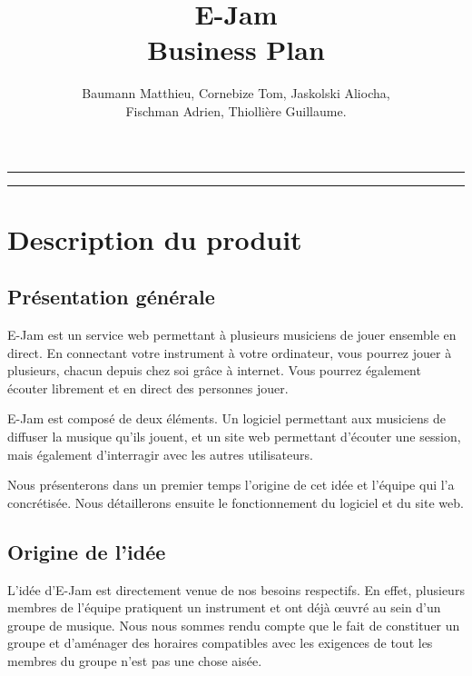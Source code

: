 \documentclass[a4,12pt]{article}
\begin{document}
\begin{titlepage}
\title{ E-Jam \\ Business Plan}
\author{Baumann Matthieu, Cornebize Tom, Jaskolski Aliocha, \\Fischman Adrien, Thiollière Guillaume.}
\end{titlepage}
\date{}

\maketitle

\rule[0.5ex]{\textwidth}{0.2mm}


\rule[0.5ex]{\textwidth}{0.2mm}

\newpage
\tableofcontents
\newpage

\section{Description du produit}


\subsection{Présentation générale}

E-Jam est un service web permettant à plusieurs musiciens de jouer ensemble en direct.
En connectant votre instrument à votre ordinateur, vous pourrez jouer à plusieurs,
chacun depuis chez soi grâce à internet.
Vous pourrez également écouter librement et en direct des personnes jouer.

E-Jam est composé de deux éléments. Un logiciel permettant aux musiciens de diffuser
la musique qu'ils jouent, et un site web permettant d'écouter une session, mais
également d'interragir avec les autres utilisateurs.

Nous présenterons dans un premier temps l'origine de cet idée et l'équipe qui
l'a concrétisée. Nous détaillerons ensuite le fonctionnement du logiciel et du
site web.



\subsection{Origine de l'idée}
L'idée d'E-Jam est directement venue de nos besoins respectifs. En effet, plusieurs
membres de l'équipe pratiquent un instrument et ont déjà œuvré au sein
d'un groupe de musique. Nous nous sommes rendu compte que le fait de constituer un
groupe et d'aménager des horaires compatibles avec les exigences de tout les membres du
groupe n'est pas une chose aisée.\\
\end{document}
